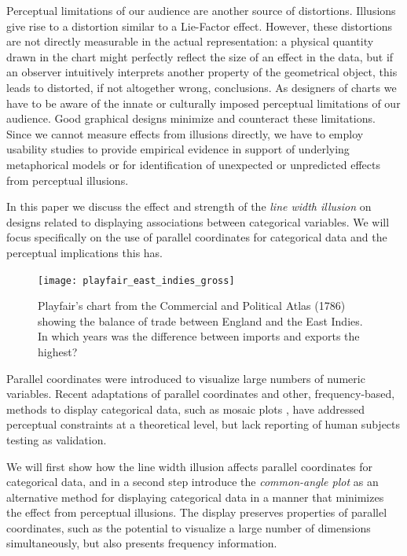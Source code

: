 Perceptual limitations of our audience are another source of distortions. Illusions  give rise to a distortion similar to a Lie-Factor effect. However, these distortions are not directly measurable in the actual representation: a physical quantity drawn in the chart might  perfectly reflect the  size of an effect in the data, but if an observer  intuitively interprets another property of the geometrical object, this leads  to distorted, if not altogether wrong, conclusions. 
As designers of charts we have to be aware of the innate or culturally imposed perceptual limitations of our audience. Good graphical designs minimize and counteract these limitations. 
Since we cannot measure effects from illusions directly, we have to employ usability studies to provide empirical evidence in support of underlying metaphorical models or for identification of unexpected or unpredicted effects from perceptual illusions.


In this paper we discuss the effect and strength of the {\it line width illusion}  on designs related to displaying associations between categorical variables. We will focus specifically on the use of parallel coordinates \citep{pcp:1885, inselberg:1985, wegman:1990} for categorical data and the perceptual implications this has.

\begin{figure}
\texttt{[image: playfair\_east\_indies\_gross]}
\caption{\label{playfair}
Playfair's chart from the Commercial and Political Atlas (1786) showing the balance of trade between England and the East Indies.  In which years was the difference between imports and exports the highest? }
\end{figure}

Parallel coordinates were introduced to visualize large numbers of numeric variables. 
Recent adaptations of parallel coordinates  \citep{ kosara:2006, bendix:2005, leblanc:1990, 
spenke:2003, schonlau:2003} and other, frequency-based, methods to display categorical data, such as mosaic plots  \citep{hartigan:1981, friendly:1992, hofmann:2000, theus:1997},  have addressed perceptual constraints \citep{cleveland:1984} at a theoretical level, but lack reporting of human subjects testing as validation. 

We will first show how the line width illusion affects  parallel coordinates for categorical data, and in a second step introduce the {\it common-angle plot} as an alternative  method for displaying categorical data in a manner that minimizes the effect from perceptual illusions.
The display preserves properties of parallel coordinates, such as the potential to visualize a large number of dimensions simultaneously, but also presents frequency information. 
 
